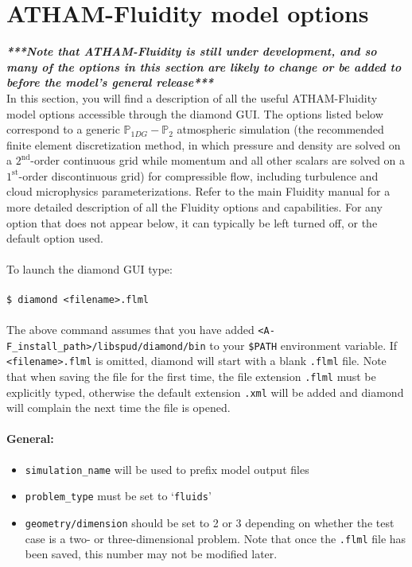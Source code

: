 \documentclass[10pt,a4paper]{article}
\newcommand\tab[1][0.5cm]{\hspace*{#1}}
\begin{document}
\section{ATHAM-Fluidity model options} \label{Config}
\textit{\textbf{***Note that ATHAM-Fluidity is still under development, and so many of the options in this section are likely to change or be added to before the model's general release***}}\\
In this section, you will find a description of all the useful ATHAM-Fluidity model options accessible through the diamond GUI. The options listed below correspond to a generic $\mathbb{P}_{1DG}-\mathbb{P}_2$ atmospheric simulation (the recommended finite element discretization method, in which pressure and density are solved on a $2^{\mathrm{nd}}$-order continuous grid while momentum and all other scalars are solved on a $1^{\mathrm{st}}$-order discontinuous grid) for compressible flow, including turbulence and cloud microphysics parameterizations. Refer to the main Fluidity manual for a more detailed description of all the Fluidity options and capabilities. For any option that does not appear below, it can typically be left turned off, or the default option used.\\\\
To launch the diamond GUI type:\\\\
\tab \texttt{\$ diamond <filename>.flml}\\\\
The above command assumes that you have added \texttt{<A-F\_install\_path>/libspud/diamond/bin} to your \texttt{\$PATH} environment variable. If \texttt{<filename>.flml} is omitted, diamond will start with a blank \texttt{.flml} file. Note that when saving the file for the first time, the file extension \texttt{.flml} must be explicitly typed, otherwise the default extension \texttt{.xml} will be added and diamond will complain the next time the file is opened.

\paragraph{General:}
\begin{itemize}
\item \texttt{simulation\_name} will be used to prefix model output files
\item \texttt{problem\_type} must be set to `\texttt{fluids}'
\item \texttt{geometry/dimension} should be set to 2 or 3 depending on whether the test case is a two- or three-dimensional problem. Note that once the \texttt{.flml} file has been saved, this number may not be modified later.
\end{itemize}
\end{document}
